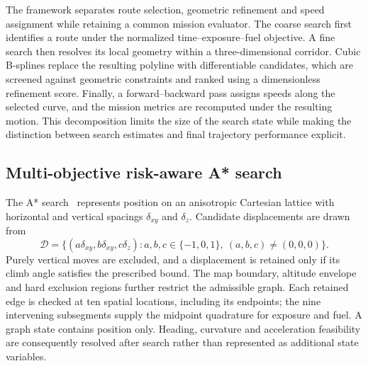 \documentclass[preprint,12pt]{elsarticle}
\begin{document}
The framework separates route selection, geometric refinement and speed
assignment while retaining a common mission evaluator. The coarse search
first identifies a route under the normalized time--exposure--fuel objective.
A fine search then resolves its local geometry within a three-dimensional
corridor. Cubic B-splines replace the resulting polyline with differentiable
candidates, which are screened against geometric constraints and ranked
using a dimensionless refinement score. Finally, a forward--backward pass
assigns speeds along the selected curve, and the mission metrics are
recomputed under the resulting motion. This decomposition limits the size
of the search state while making the distinction between search estimates
and final trajectory performance explicit.


\subsection{Multi-objective risk-aware A* search}
\label{sec:astar}

The A* search~\cite{hart1968} represents position on an anisotropic Cartesian lattice
with horizontal and vertical spacings $\delta_{xy}$ and $\delta_z$.
Candidate displacements are drawn from
\begin{equation}
 \mathcal{D}=\{(a\delta_{xy},b\delta_{xy},c\delta_z):
 a,b,c\in\{-1,0,1\},\ (a,b,c)\ne(0,0,0)\}.
 \label{me:eq:neighbors}
\end{equation}
Purely vertical moves are excluded, and a displacement is retained only
if its climb angle satisfies the prescribed bound. The map boundary,
altitude envelope and hard exclusion regions further restrict the
admissible graph. Each retained edge is checked at ten spatial locations,
including its endpoints; the nine intervening subsegments supply the
midpoint quadrature for exposure and fuel. A graph state contains position
only. Heading, curvature and acceleration feasibility are consequently
resolved after search rather than represented as additional state variables.
\end{document}

